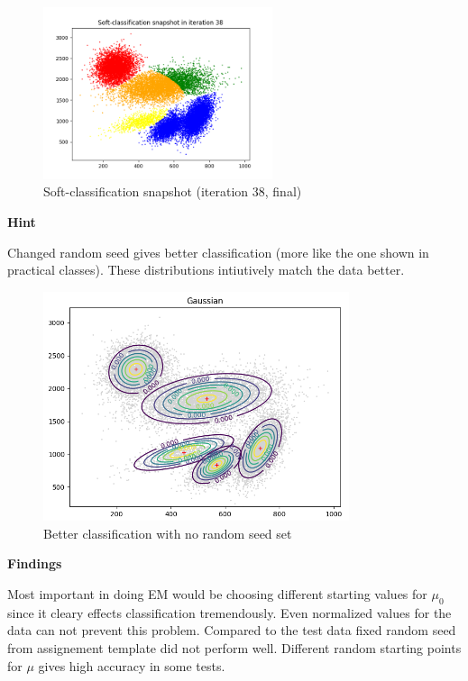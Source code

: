 \documentclass[12pt,a4paper]{article}
\begin{document}
\begin{enumerate}[start=2,label*={\arabic*.}]
\begin{figure}[H]
  \centering
  \includegraphics[width=0.6\textwidth]{figures/sc_38.png}
	\caption{Soft-classification snapshot (iteration 38, final)}
	\label{sc_36}
\end{figure}

\textbf{Hint}

Changed random seed gives better classification (more like the one shown in
practical classes). These distributions intiutively match the data better.

\begin{figure}[H]
  \centering
  \includegraphics[width=0.8\textwidth]{figures/1_no_seed.png}
	\caption{Better classification with no random seed set}
	\label{1_no_seed}
\end{figure}

\textbf{Findings}

Most important in doing EM would be choosing different starting values for
$\mu_0$ since it cleary effects classification tremendously. Even normalized
values for the data can not prevent this problem. Compared to the test data
fixed random seed from assignement template did not perform well. Different
random starting points for $\mu$ gives high accuracy in some tests.

\end{enumerate}
\newpage
\end{document}
